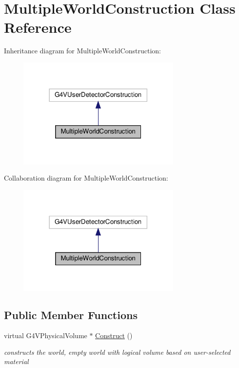\hypertarget{classMultipleWorldConstruction}{}\section{Multiple\+World\+Construction Class Reference}
\label{classMultipleWorldConstruction}


Inheritance diagram for Multiple\+World\+Construction\+:
\nopagebreak
\begin{figure}[H]
\begin{center}
\leavevmode
\includegraphics[width=230pt]{classMultipleWorldConstruction__inherit__graph}
\end{center}
\end{figure}


Collaboration diagram for Multiple\+World\+Construction\+:
\nopagebreak
\begin{figure}[H]
\begin{center}
\leavevmode
\includegraphics[width=230pt]{classMultipleWorldConstruction__coll__graph}
\end{center}
\end{figure}
\subsection*{Public Member Functions}
\begin{DoxyCompactItemize}
\item 
\mbox{\label{classMultipleWorldConstruction_a9938de8bb542846fb6a19988baeb5de4}} 
virtual G4\+V\+Physical\+Volume $\ast$ \hyperlink{classMultipleWorldConstruction_a9938de8bb542846fb6a19988baeb5de4}{Construct} ()
\begin{DoxyCompactList}\small\item\em constructs the world, empty world with logical volume based on user-\/selected material \end{DoxyCompactList}\end{DoxyCompactItemize}


